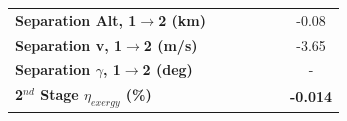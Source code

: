 \begin{table}[!ht]
\begin{tabular}{l c c c c c c}
	\textbf{Separation Alt, 1$\rightarrow$2 (km)}
	& \firstsecondSeparationAltmFuelNinetyNoReturn
	& \firstsecondSeparationAltmFuelNinetyFiveNoReturn
	& \firstsecondSeparationAltmFuelStandardNoReturn
	& \firstsecondSeparationAltmFuelOneHundredFiveNoReturn
	& \firstsecondSeparationAltmFuelOneHundredTenNoReturn
	&-0.08
	\\
	\textbf{Separation v, 1$\rightarrow$2 (m/s)}
	& \firstsecondSeparationvmFuelNinetyNoReturn
	& \firstsecondSeparationvmFuelNinetyFiveNoReturn
	& \firstsecondSeparationvmFuelStandardNoReturn
	& \firstsecondSeparationvmFuelOneHundredFiveNoReturn
	& \firstsecondSeparationvmFuelOneHundredTenNoReturn
	&-3.65
	\\
	\textbf{Separation $\gamma$, 1$\rightarrow$2 (deg)}
	& \firstsecondSeparationgammamFuelNinetyNoReturn
	& \firstsecondSeparationgammamFuelNinetyFiveNoReturn
	& \firstsecondSeparationgammamFuelStandardNoReturn
	& \firstsecondSeparationgammamFuelOneHundredFiveNoReturn
	& \firstsecondSeparationgammamFuelOneHundredTenNoReturn
	& -
	\\
	\hline 
	\textbf{2$^{nd}$ Stage $\eta_{exergy}$ (\%)}
	& \textbf{\secondExergyEffmFuelNinetyNoReturn}
	& \textbf{\secondExergyEffmFuelNinetyFiveNoReturn}
	& \textbf{\secondExergyEffmFuelStandardNoReturn}
	& \textbf{\secondExergyEffmFuelOneHundredFiveNoReturn}
	& \textbf{\secondExergyEffmFuelOneHundredTenNoReturn}
	& \textbf{-0.014}
	\\


\end{tabular}
\end{table}
